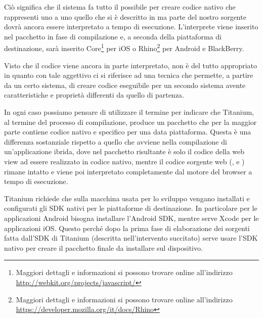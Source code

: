             Ciò significa che il sistema fa tutto il possibile per creare codice
            nativo che rappresenti uno a uno quello che si è descritto in
            \js{} ma parte del nostro sorgente dovrà ancora essere
            interpretato a tempo di esecuzione. L'interprete \js{} viene
            inserito nel pacchetto in fase di compilazione e, a seconda della
            piattaforma di destinazione, sarà inserito
            \js{}Core\footnote{Maggiori dettagli e informazioni si possono
            trovare online all'indirizzo\\ \url{http://webkit.org/projects/javascript/}}
            per iOS o Rhino\footnote{Maggiori dettagli e informazioni si possono trovare
            online all'indirizzo\\ \url{https://developer.mozilla.org/it/docs/Rhino}}
            per Android e BlackBerry\citep{Web:KevinPost}.

            Visto che il codice \js{} viene ancora in parte interpretato,
            \crosscomp{} non è del tutto appropriato in quanto con tale
            aggettivo ci si riferisce ad una tecnica che permette, a partire da
            un certo sistema, di creare codice eseguibile per un secondo sistema
            avente caratteristiche e proprietà differenti da quello di
            partenza\citep{Web:Wiki.cross-compiling}.

            In ogni caso possiamo pensare di utilizzare il termine
            \crosscomp{} per indicare che Titanium, al termine del processo di
            compilazione, produce un pacchetto che per la
            maggior parte contiene codice nativo e specifico per una data
            piattaforma. Questa è una differenza sostanziale rispetto a quello
            che avviene nella compilazione di un'applicazione ibrida, dove nel
            pacchetto risultante è solo il codice della web view ad essere
            realizzato in codice nativo, mentre il codice sorgente web
            (\js{}, \html{} e \css{}) rimane intatto e viene poi interpretato
            completamente dal motore del browser a tempo di esecuzione.

            Titanium richiede che sulla macchina usata per lo sviluppo vengano
            installati e configurati gli SDK nativi per le piattaforme di
            destinazione. In particolare per le applicazioni Android bisogna
            installare l'Android SDK, mentre serve Xcode per le applicazioni
            iOS. Questo perché dopo la prima fase di elaborazione dei sorgenti
            fatta dall'SDK di Titanium (descritta nell'intervento succitato)
            serve usare l'SDK nativo per creare il pacchetto finale da
            installare sul dispositivo.

